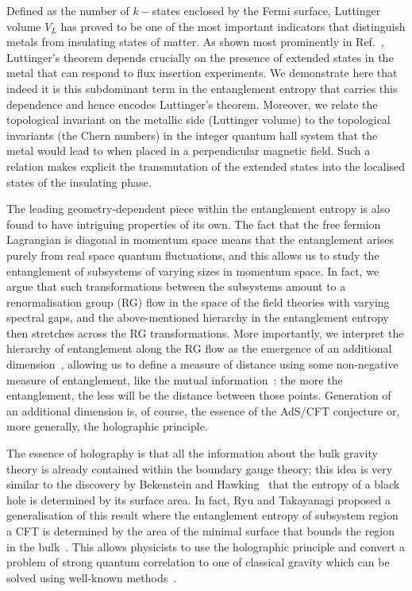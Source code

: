 Defined as the number of \(k-\)states enclosed by the Fermi surface, Luttinger volume \(V_L\) has proved to be one of the most important indicators that distinguish metals from insulating states of matter. As shown most prominently in  Ref.~\cite{oshikawa2000topological}, Luttinger's theorem depends crucially on the presence of extended states in the metal that can respond to flux insertion experiments. We demonstrate here that indeed it is this subdominant term in the entanglement entropy that carries this dependence and hence encodes Luttinger's theorem. Moreover, we relate the topological invariant on the metallic side (Luttinger volume) to the topological invariants (the Chern numbers) in the integer quantum hall system that the metal would lead to when placed in a perpendicular magnetic field. Such a relation makes explicit the transmutation of the extended states into the localised states of the insulating phase.

The leading geometry-dependent piece within the entanglement entropy is also found to have intriguing properties of its own.
The fact that the free fermion Lagrangian is diagonal in momentum space means that the entanglement arises purely from real space quantum fluctuations, and this allows us to study the entanglement of subsystems of varying sizes in momentum space. In fact, we argue that such transformations between the subsystems amount to a renormalisation group (RG) flow in the space of the field theories with varying spectral gaps, and the above-mentioned hierarchy in the entanglement entropy then stretches across the RG transformations. More importantly, we interpret the hierarchy of entanglement along the RG flow as the emergence of an additional dimension~\cite{hooft_1993,Verlinde2011,chiang_2016}, allowing us to define a measure of distance using some non-negative measure of entanglement, like the mutual information~\cite{van2010building,raamsdonk_lectures,qi2013,lee2016}: the more the entanglement, the less will be the distance between those points. Generation of an additional dimension is, of course, the essence of the AdS/CFT conjecture or, more generally, the holographic principle.

The essence of holography is that all the information about the bulk gravity theory is already contained within the boundary gauge theory; this idea is very similar to the discovery by Bekenstein and Hawking~\cite{bekenstein_1973,Hawking_1974,Hawking_1975} that the entropy of a black hole is determined by its surface area. In fact, Ryu and Takayanagi proposed a generalisation of this result where the entanglement entropy of subsystem region a CFT is determined by the area of the minimal surface that bounds the region in the bulk~\cite{ryu2006,ryu2006aspects}.
This allows physicists to use the holographic principle and convert a problem of strong quantum correlation to one of classical gravity which can be solved using well-known methods~\cite{Hartnoll_2009,sachdev_2012}.

